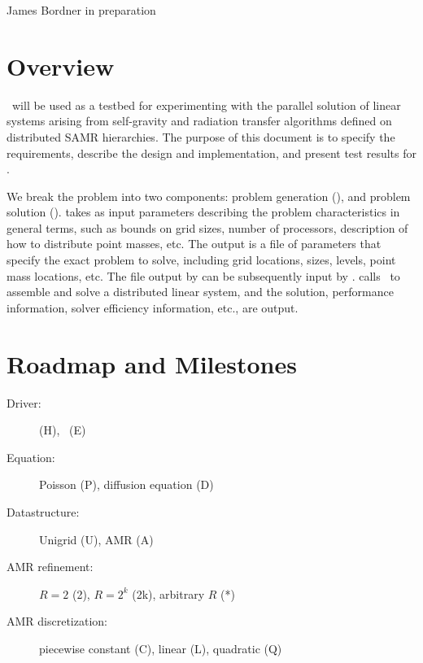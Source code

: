\documentclass[10pt]{article}
\begin{document}
      {James Bordner}
      {in preparation}

\tableofcontents
\section{Overview}

   \hypresolve\ will be used as a testbed for experimenting with the
   parallel solution of linear systems arising from self-gravity and
   radiation transfer algorithms defined on distributed SAMR
   hierarchies.  The purpose of this document is to specify the
   requirements, describe the design and implementation, and present
   test results for \hypresolve.

   We break the problem into two components: problem generation
   (), and problem solution ().
    takes as input parameters describing the problem
   characteristics in general terms, such as bounds on grid sizes,
   number of processors, description of how to distribute point
   masses, etc.  The output is a file of parameters that specify the
   exact problem to solve, including grid locations, sizes, levels,
   point mass locations, etc.  The file output by 
   can be subsequently input by .
    calls \hypre\ to assemble and solve a
   distributed linear system, and the solution, performance
   information, solver efficiency information, etc., are output.

\section{Roadmap and Milestones}


\begin{description}
\item[Driver: ]  (H), \enzo\ (E)
\item[Equation: ] Poisson (P), diffusion equation (D)
\item[Datastructure: ] Unigrid (U), AMR (A)
\item[AMR refinement: ] $R=2$ (2), $R=2^k$ (2k), arbitrary $R$ (*)
\item[AMR discretization: ] piecewise constant (C), linear (L), quadratic (Q)
\end{description}
\end{document}
